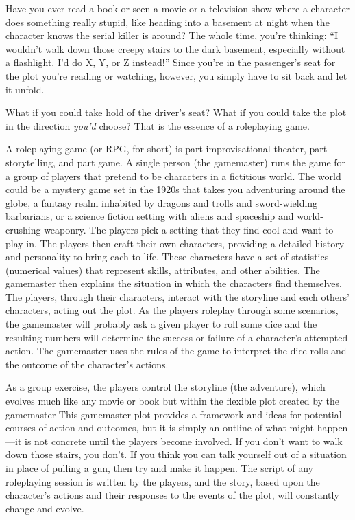 Have you ever read a book or seen a movie or a television
show where a character does something really
stupid, like heading into a basement at night when the 
character knows the serial killer is around? The whole 
time, you're thinking: ``I wouldn't walk down those 
creepy stairs to the dark basement, especially without a 
flashlight. I'd do X, Y, or Z instead!'' Since you're in the 
passenger's seat for the plot you're reading or watching, 
however, you simply have to sit back and let it unfold. 

What if you could take hold of the driver's seat? 
What if you could take the plot in the direction \textit{you'd} 
choose? That is the essence of a roleplaying game.

A roleplaying game (or RPG, for short) is part improvisational
theater, part storytelling, and part game.
A single person (the gamemaster) runs the game for 
a group of players that pretend to be characters in a 
fictitious world. The world could be a mystery game 
set in the 1920s that takes you adventuring around 
the globe, a fantasy realm inhabited by dragons 
and trolls and sword-wielding barbarians, or a science
fiction setting with aliens and spaceship and
world-crushing weaponry. The players pick a setting 
that they find cool and want to play in. The players 
then craft their own characters, providing a detailed 
history and personality to bring each to life. These 
characters have a set of statistics (numerical values) 
that represent skills, attributes, and other abilities. 
The gamemaster then explains the situation in which 
the characters find themselves. The players, through 
their characters, interact with the storyline and each 
others' characters, acting out the plot. As the players 
roleplay through some scenarios, the gamemaster will 
probably ask a given player to roll some dice and the 
resulting numbers will determine the success or failure 
of a character's attempted action. The gamemaster 
uses the rules of the game to interpret the dice rolls 
and the outcome of the character's actions.

As a group exercise, the players control the storyline 
(the adventure), which evolves much like any movie or 
book but within the flexible plot created by the gamemaster
This gamemaster plot provides a framework
and ideas for potential courses of action and outcomes, 
but it is simply an outline of what might happen—it 
is not concrete until the players become involved. If 
you don't want to walk down those stairs, you don't. 
If you think you can talk yourself out of a situation 
in place of pulling a gun, then try and make it happen. 
The script of any roleplaying session is written by the 
players, and the story, based upon the character's actions
and their responses to the events of the plot, will
constantly change and evolve.

